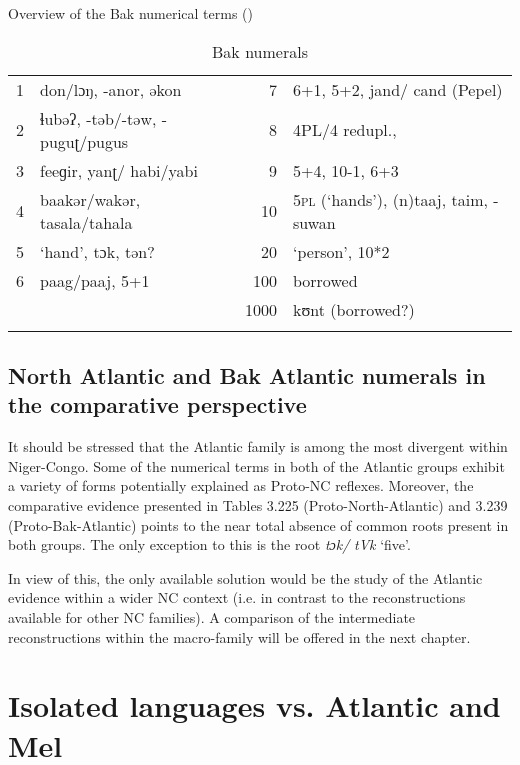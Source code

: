 Overview of the Bak numerical terms ()

\begin{table}
\caption{\label{tab:3:247}Bak numerals}


\begin{tabularx}{\textwidth}{ll@{}rQ}
\lsptoprule

1 & don/lɔŋ, -anor, əkon & 7 & 6+1, 5+2, jand/ cand (Pepel)\\
2 & ɬubəʔ, -təb/-təw, -puguʈ/pugus & 8 & 4PL/4 redupl., \\
3 & feeɡir, yanʈ/ habi/yabi & 9 & 5+4, 10-1, 6+3\\
4 & baakər/wakər, tasala/tahala & 10 & 5\textsc{pl} (‘hands’), (n)taaj, taim, -suwan\\
5 & ‘hand’, tɔk, tən? & 20 & ‘person’, 10*2\\
6 & paag/paaj, 5+1 & 100 & borrowed\\
&  & 1000 & kʊnt (borrowed?)\\
\lspbottomrule
\end{tabularx}
\end{table}

 
\subsection{North Atlantic and Bak Atlantic numerals in the comparative perspective}%
It should be stressed that the Atlantic family is among the most divergent within Niger-Congo. Some of the numerical terms in both of the Atlantic groups exhibit a variety of forms potentially explained as Proto-NC reflexes. Moreover, the comparative evidence presented in Tables 3.225 (Proto-North-Atlantic) and 3.239 (Proto-Bak-Atlantic) points to the near total absence of common roots present in both groups. The only exception to this is the root \textit{tɔk/} \textit{tVk} ‘five’.

In view of this, the only available solution would be the study of the Atlantic evidence within a wider NC context (i.e. in contrast to the reconstructions available for other NC families). A comparison of the intermediate reconstructions within the macro-family will be offered in the next chapter.
\clearpage
\section{Isolated languages vs. Atlantic and Mel}%


